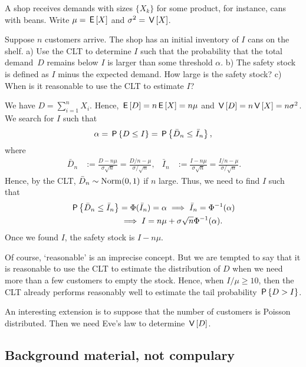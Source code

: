 \begin{exercise}
A shop receives demands with sizes $\{X_{k}\}$ for some product, for instance, cans with beans.
Write $\mu = \E X$ and $\sigma^{2} = \V X$.

Suppose $n$ customers arrive.
The shop has an initial inventory of $I$ cans on the shelf.
a) Use the CLT to determine $I$ such that the probability that the total demand~$D$ remains below $I$ is larger than some threshold $\alpha$.
b) The safety stock is defined as $I$ minus the expected demand.
How large is the safety stock?
c) When is it reasonable to use the CLT to estimate $I$?
\begin{solution}
We have $D=\sum_{i=1}^{n} X_{i}$. Hence, $\E D = n \E X = n \mu$ and $\V D = n \V X = n \sigma^{2}$. We search for $I$ such that
\begin{equation}
  \label{eq:131}
\alpha = \P{D \leq I}   = \P{\bar D_n \leq \bar I_{n}},
\end{equation}
where
\begin{align}
  \label{eq:132}\
\bar D_{n} &:= \frac{D-n\mu}{\sigma \sqrt n}   = \frac{D/n - \mu}{\sigma/\sqrt n}, &
\bar I_{n} &:= \frac{I-n\mu}{\sigma \sqrt n}   = \frac{I/n - \mu}{\sigma/\sqrt n}.
\end{align}
Hence, by the CLT, $\bar D_{n}\sim \Norm{0, 1}$ if $n$ large. Thus, we need to find $I$ such that
\begin{align}
\P{\bar D_{n} \leq \bar I_{n}} &= \Phi(\bar I_{n}) = \alpha \implies \bar I_{n} = \Phi^{-1}(\alpha) \\
&\implies  I = n\mu + \sigma \sqrt n \Phi^{-1}(\alpha).
\end{align}
Once we found $I$, the safety stock is $I-n\mu$.

Of course, `reasonable' is an imprecise concept.
But we are tempted to say that it is reasonable to use the CLT to estimate the distribution of $D$ when we need more than a few customers to empty the stock.
Hence, when $I/\mu \geq 10$, then the CLT already performs reasonably well to estimate the tail probability $\P{D>I}$.

An interesting extension is to suppose that the number of customers is Poisson distributed. Then we need Eve's law to determine $\V D$.

\end{solution}
\end{exercise}



\subsection{Background material, not compulary}
\label{sec:backgr-mater-not}

